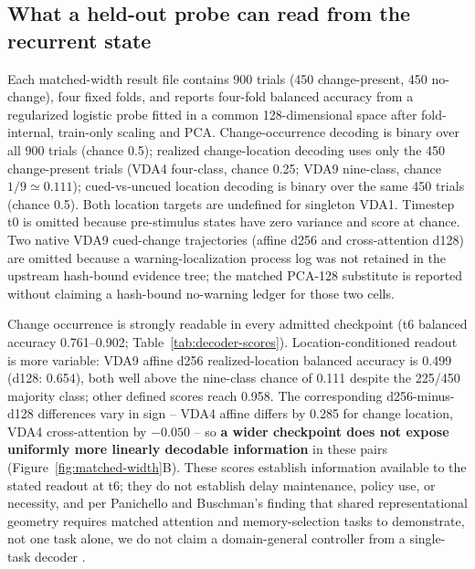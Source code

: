 \documentclass[11pt,a4paper]{article}
\begin{document}
\subsection{What a held-out probe can read from the recurrent state}\label{sec:width-decoding}
Each matched-width result file contains 900 trials (450 change-present, 450 no-change), four fixed folds, and reports four-fold balanced accuracy from a regularized logistic probe fitted in a common 128-dimensional space after fold-internal, train-only scaling and PCA. Change-occurrence decoding is binary over all 900 trials (chance 0.5); realized change-location decoding uses only the 450 change-present trials (VDA4 four-class, chance 0.25; VDA9 nine-class, chance $1/9\simeq0.111$); cued-vs-uncued location decoding is binary over the same 450 trials (chance 0.5). Both location targets are undefined for singleton VDA1. Timestep t0 is omitted because pre-stimulus states have zero variance and score at chance. Two native VDA9 cued-change trajectories (affine d256 and cross-attention d128) are omitted because a warning-localization process log was not retained in the upstream hash-bound evidence tree; the matched PCA-128 substitute is reported without claiming a hash-bound no-warning ledger for those two cells.

Change occurrence is strongly readable in every admitted checkpoint (t6 balanced accuracy 0.761--0.902; Table~\ref{tab:decoder-scores}). Location-conditioned readout is more variable: VDA9 affine d256 realized-location balanced accuracy is 0.499 (d128: 0.654), both well above the nine-class chance of 0.111 despite the 225/450 majority class; other defined scores reach 0.958. The corresponding d256-minus-d128 differences vary in sign -- VDA4 affine differs by 0.285 for change location, VDA4 cross-attention by $-0.050$ -- so \textbf{a wider checkpoint does not expose uniformly more linearly decodable information} in these pairs (Figure~\ref{fig:matched-width}B). These scores establish information available to the stated readout at t6; they do not establish delay maintenance, policy use, or necessity, and per Panichello and Buschman's finding that shared representational geometry requires matched attention and memory-selection tasks to demonstrate, not one task alone, we do not claim a domain-general controller from a single-task decoder \cite{panichello2021}.
\end{document}

